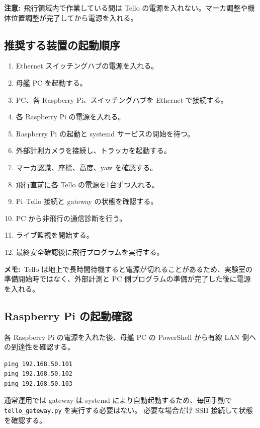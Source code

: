 \documentclass[11pt,a4paper]{ltjsarticle}
\newcommand{\code}[1]{\texttt{\small #1}}
\newcommand{\note}[1]{\par\smallskip\noindent\textbf{メモ:}~#1\par\smallskip}
\newcommand{\warning}[1]{\par\smallskip\noindent\textbf{注意:}~#1\par\smallskip}
\begin{document}
\warning{飛行領域内で作業している間は Tello の電源を入れない。マーカ調整や機体位置調整が完了してから電源を入れる。}

\subsection{推奨する装置の起動順序}

\begin{enumerate}[leftmargin=1.6em]
  \item Ethernet スイッチングハブの電源を入れる。
  \item 母艦 PC を起動する。
  \item PC、各 Raspberry Pi、スイッチングハブを Ethernet で接続する。
  \item 各 Raspberry Pi の電源を入れる。
  \item Raspberry Pi の起動と systemd サービスの開始を待つ。
  \item 外部計測カメラを接続し、トラッカを起動する。
  \item マーカ認識、座標、高度、yaw を確認する。
  \item 飛行直前に各 Tello の電源を1台ずつ入れる。
  \item Pi--Tello 接続と gateway の状態を確認する。
  \item PC から非飛行の通信診断を行う。
  \item ライブ監視を開始する。
  \item 最終安全確認後に飛行プログラムを実行する。
\end{enumerate}

\note{Tello は地上で長時間待機すると電源が切れることがあるため、実験室の準備開始時ではなく、外部計測と PC 側プログラムの準備が完了した後に電源を入れる。}

\subsection{Raspberry Pi の起動確認}

各 Raspberry Pi の電源を入れた後、母艦 PC の PowerShell から有線 LAN 側への到達性を確認する。

\begin{lstlisting}
ping 192.168.50.101
ping 192.168.50.102
ping 192.168.50.103
\end{lstlisting}

通常運用では gateway は systemd により自動起動するため、毎回手動で \code{tello\_gateway.py} を実行する必要はない。
必要な場合だけ SSH 接続して状態を確認する。
\end{document}
